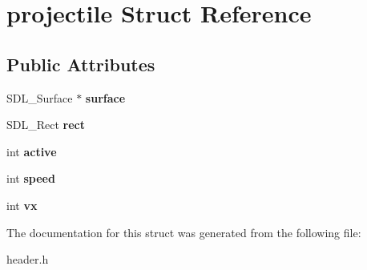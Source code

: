 \hypertarget{structprojectile}{}\section{projectile Struct Reference}
\label{structprojectile}
\subsection*{Public Attributes}
\begin{DoxyCompactItemize}
\item 
\mbox{\label{structprojectile_acbb67899abcc06c86f8747f2059db168}} 
S\+D\+L\+\_\+\+Surface $\ast$ {\bfseries surface}
\item 
\mbox{\label{structprojectile_a450e7ca8a05fe4043a63e73b88f4c7a9}} 
S\+D\+L\+\_\+\+Rect {\bfseries rect}
\item 
\mbox{\label{structprojectile_aa84ac35cbc967bee2b13a4d31ff11360}} 
int {\bfseries active}
\item 
\mbox{\label{structprojectile_aa2af53bce63feecb719ef1edba54689e}} 
int {\bfseries speed}
\item 
\mbox{\label{structprojectile_a040b3444ff891d8a74416a850986b14b}} 
int {\bfseries vx}
\end{DoxyCompactItemize}


The documentation for this struct was generated from the following file\+:\begin{DoxyCompactItemize}
\item 
header.\+h\end{DoxyCompactItemize}
